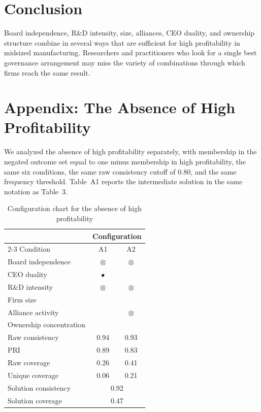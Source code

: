 \documentclass[11pt]{article}
\newcommand{\periin}{{\small$\bullet$}}
\newcommand{\coreout}{{\Large$\otimes$}}
\newcommand{\periout}{{\small$\otimes$}}
\begin{document}
\section{Conclusion}

Board independence, R\&D intensity, size, alliances, CEO duality, and ownership structure combine in several ways that are sufficient for high profitability in midsized manufacturing. Researchers and practitioners who look for a single best governance arrangement may miss the variety of combinations through which firms reach the same result.

\clearpage
\appendix
\section*{Appendix: The Absence of High Profitability}

We analyzed the absence of high profitability separately, with membership in the negated outcome set equal to one minus membership in high profitability, the same six conditions, the same raw consistency cutoff of 0.80, and the same frequency threshold. Table~A1 reports the intermediate solution in the same notation as Table~3.

\begin{table}[h]
\centering
\renewcommand{\thetable}{A1}
\caption{Configuration chart for the absence of high profitability}
\begin{tabular}{lcc}
\toprule
 & \multicolumn{2}{c}{Configuration} \\
\cmidrule(lr){2-3}
Condition & A1 & A2 \\
\midrule
Board independence & \coreout & \coreout \\
CEO duality & \periin & \\
R\&D intensity & \periout & \periout \\
Firm size & & \\
Alliance activity & & \coreout \\
Ownership concentration & & \\
\midrule
Raw consistency & 0.94 & 0.93 \\
PRI & 0.89 & 0.83 \\
Raw coverage & 0.26 & 0.41 \\
Unique coverage & 0.06 & 0.21 \\
\midrule
Solution consistency & \multicolumn{2}{c}{0.92} \\
Solution coverage & \multicolumn{2}{c}{0.47} \\
\bottomrule
\end{tabular}
\end{table}
\end{document}
